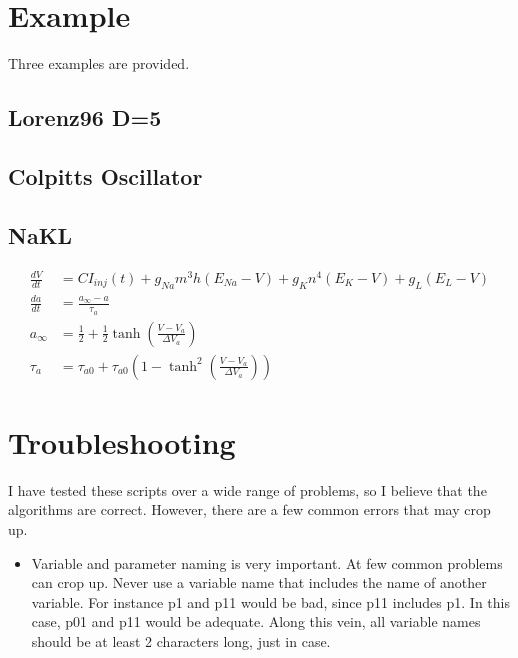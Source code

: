 \documentclass[11pt]{article}
\begin{document}
\section{Example}
Three examples are provided.
\subsection{Lorenz96 D=5}
\subsection{Colpitts Oscillator}
\subsection{NaKL}
\begin{align*}
\frac{dV}{dt}&=CI_{inj}(t) + g_{Na}m^3h(E_{Na}-V) + g_{K}n^4(E_K-V) + g_L(E_L-V)\\
\frac{da}{dt}&=\frac{a_\infty-a}{\tau_a}\\
a_\infty&=\frac12+\frac12\tanh\left(\frac{V-V_a}{\Delta V_a}\right)\\
\tau_a&=\tau_{a0}+\tau_{a0}\left(1-\tanh^2\left(\frac{V-V_a}{\Delta V_a}\right)\right)
\end{align*}
\section{Troubleshooting}
I have tested these scripts over a wide range of problems, so I believe that the algorithms are correct. However, there are a few common errors that may crop up.
\begin{itemize}
\item Variable and parameter naming is very important. At few common problems can crop up. Never use a variable name that includes the name of another variable. For instance p1 and p11 would be bad, since p11 includes p1. In this case, p01 and p11 would be adequate. Along this vein, all variable names should be at least 2 characters long, just in case.
\end{itemize}
\end{document}
